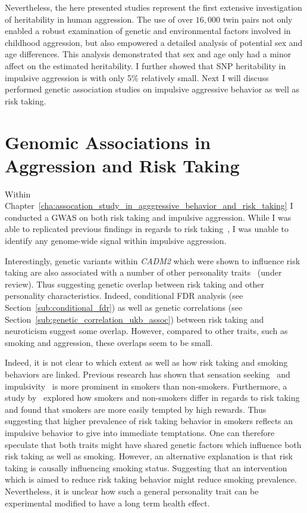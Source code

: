 Nevertheless, the here presented studies represent the first extensive investigation of heritability in human aggression.
The use of over $16,000$ twin pairs not only enabled a robust examination of genetic and environmental factors involved in childhood aggression, but also empowered a detailed analysis of potential sex and age differences.
This analysis demonstrated that sex and age only had a minor affect on the estimated heritability.
I further showed that SNP heritability in impulsive aggression is with only 5\% relatively small.
Next I will discuss performed genetic association studies on impulsive aggressive behavior as well as risk taking. 

\section{Genomic Associations in Aggression and Risk Taking}
\label{sec:genomic_associations_in_aggression_and_risk_taking}

Within Chapter~\ref{cha:assocation_study_in_agggressive_behavior_and_risk_taking} I conducted a GWAS on both risk taking and impulsive aggression.
While I was able to replicated previous findings in regards to risk taking~\cite{Day2016}, I was unable to identify any genome-wide signal within impulsive aggression.

Interestingly, genetic variants within \textit{CADM2} which were shown to influence risk taking are also associated with a number of other personality traits~\cite{Boutwell2017} (under review).
Thus suggesting genetic overlap between risk taking and other personality characteristics.
Indeed, conditional FDR analysis (see Section~\ref{sub:conditional_fdr}) as well as genetic correlations (see Section~\ref{sub:genetic_correlation_ukb_assoc}) between risk taking and neuroticism suggest some overlap.
However, compared to other traits, such as smoking and aggression, these overlaps seem to be small. 

Indeed, it is not clear to which extent as well as how risk taking and smoking behaviors are linked.
Previous research has shown that sensation seeking~\cite{Carton1994} and impulsivity~\cite{Glicksohn2007,Mitchell1999} is more prominent in smokers than non-smokers.
Furthermore, a study by~\citet{Ert2013} explored how smokers and non-smokers differ in regards to risk taking and found that smokers are more easily tempted by high rewards.
Thus suggesting that higher prevalence of risk taking behavior in smokers reflects an impulsive behavior to give into immediate temptations. 
One can therefore speculate that both traits might have shared genetic factors which influence both risk taking as well as smoking.
However, an alternative explanation is that risk taking is causally influencing smoking status.
Suggesting that an intervention which is aimed to reduce risk taking behavior might reduce smoking prevalence. 
Nevertheless, it is unclear how such a general personality trait can be experimental modified to have a long term health effect.

